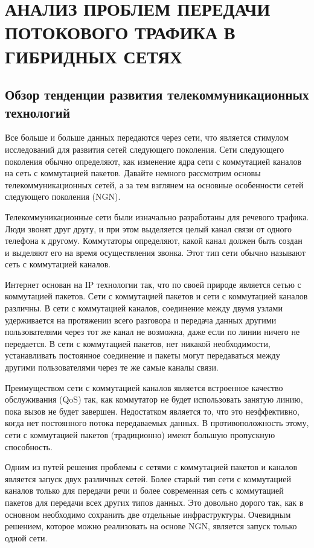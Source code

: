 \chapter[АНАЛИЗ \ ПРОБЛЕМ \ ПЕРЕДАЧИ \ ПОТОКОВОГО ТРАФИКА В ГИБРИДНЫХ СЕТЯХ]{АНАЛИЗ ПРОБЛЕМ ПЕРЕДАЧИ ПОТОКОВОГО ТРАФИКА В ГИБРИДНЫХ СЕТЯХ} \label{chapt1}


\section{Обзор тенденции развития телекоммуникационных технологий} \label{sect1_0}

Все больше и больше данных передаются через сети, что является стимулом исследований для развития сетей следующего поколения.
Сети следующего поколения обычно определяют, как изменение ядра сети с коммутацией каналов на сеть с коммутацией пакетов.
Давайте немного рассмотрим основы телекоммуникационных сетей, а за тем взглянем на основные особенности сетей следующего поколения (NGN).

Телекоммуникационные сети были изначально разработаны для речевого трафика. 
Люди звонят друг другу, и при этом выделяется целый канал связи от одного телефона к другому. 
Коммутаторы определяют, какой канал должен быть создан и выделяют его на время осуществления звонка.
Этот тип сети обычно называют сеть с коммутацией каналов.

Интернет основан на IP технологии так, что по своей природе является сетью с коммутацией пакетов.
Сети с коммутацией пакетов и сети с коммутацией каналов различны.
В сети с коммутацией каналов, соединение между двумя узлами удерживается на протяжении всего разговора и передача данных другими пользователями через тот же канал не возможна, даже если по линии ничего не передается.
В сети с коммутацией пакетов, нет никакой необходимости, устанавливать постоянное соединение и пакеты могут передаваться между другими пользователями через те же самые каналы связи.

Преимуществом сети с коммутацией каналов является встроенное качество обслуживания (QoS) так, как коммутатор не будет использовать занятую линию, пока вызов не будет завершен.
Недостатком является то, что это неэффективно, когда нет постоянного потока передаваемых данных.
В противоположность этому, сети с коммутацией пакетов (традиционно) имеют большую пропускную способность.

Одним из путей решения проблемы с сетями с коммутацией пакетов и каналов является запуск двух различных сетей. 
Более старый тип сети с коммутацией каналов только для передачи речи и более современная сеть с коммутацией пакетов для передачи всех других типов данных.
Это довольно дорого так, как в основном необходимо сохранить две отдельные инфраструктуры.
Очевидным решением, которое можно реализовать на основе NGN, является запуск только одной сети.


